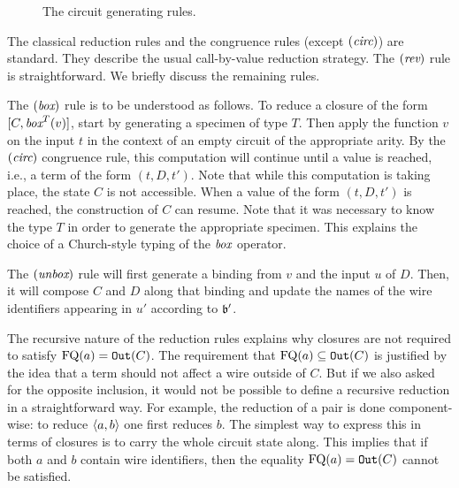 \documentclass[twoside]{article}
\begin{document}
\begin{figure}[p]
\scalebox{0.97}{\begin{minipage}{\textwidth}
\begin{mdframed}
\[
  \infer[(\boxx)]{[C,\boxx^T(v)]\to [C,(t,D,vt)]}{
    \spec_{\FQ(v)}(T)=t
    &
    \mathtt{new}(\FQ(t))=D
  }
\]
\[
  \infer[(\unbox)]{[C,(\unbox\,(u,D,u'))v]\to [C',\binding'(u')]}{
    \bind(v,u)=\binding 
    &
    \mathtt{Append}(C,D,\binding) = (C',\binding') 
    &
    \FQ(u')\seq\dom(\binding')
  }
\]
\[
  \infer[(\rev)]{[C,\rev\,(t,C,t')]\to [C,(t',C^{-1},t)]}{}
\]
\end{mdframed}
\end{minipage}}
\caption{The circuit generating rules.}
\label{circ_gen_rules}
\end{figure}

The classical reduction rules and the congruence rules (except $(\textit{circ})$) 
are standard. They describe the usual call-by-value reduction strategy. 
The $(\mathop{\textit{rev}}\nolimits)$ rule is straightforward. We briefly discuss the remaining 
rules. 

The $(\mathop{\textit{box}}\nolimits)$ rule is to be understood as follows. To reduce a closure
of the form $[C, \mathop{\textit{box}}\nolimits^T(v)]$, start by generating a specimen of type
$T$. Then apply the function $v$ on the input $t$ in the context of an
empty circuit of the appropriate arity.  By the $(\textit{circ})$
congruence rule, this computation will continue until a value is
reached, i.e., a term of the form $(t,D,t')$. Note that while this
computation is taking place, the state $C$ is not accessible. When a
value of the form $(t,D,t')$ is reached, the construction of $C$ can
resume. Note that it was necessary to know the type $T$ in order to
generate the appropriate specimen. This explains the choice of a
Church-style typing of the $\mathop{\textit{box}}\nolimits$ operator. 

The $(\mathop{\textit{unbox}}\nolimits)$ rule will first generate a binding from $v$ and the
input $u$ of $D$. Then, it will compose $C$ and $D$ along that binding
and update the names of the wire identifiers appearing in $u'$
according to $\mathfrak{b}'$. 

The recursive nature of the reduction rules explains why closures are 
not required to satisfy $\mathop{\textrm{FQ}}\nolimits(a)=\mathtt{Out}(C)$. The requirement that 
$\mathop{\textrm{FQ}}\nolimits(a)\subseteq \mathtt{Out}(C)$ is justified by the idea that a term 
should not affect a wire outside of $C$. But if we also asked for the 
opposite inclusion, it would not be possible to define a recursive
reduction in a straightforward way. For example, the reduction of a 
pair is done component-wise: to reduce $\langle a,b\rangle$ one first reduces $b$. 
The simplest way to express this in terms of closures is to carry the 
whole circuit state along. This implies that if both $a$ and $b$ 
contain wire identifiers, then the equality $\mathop{\textrm{FQ}}\nolimits(a)=\mathtt{Out}(C)$ 
cannot be satisfied.
\end{document}

